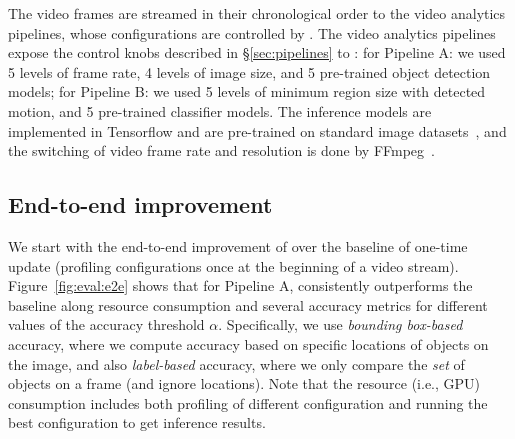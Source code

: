 The video frames are streamed in their chronological order to the video analytics pipelines, whose configurations are controlled by \name.
The video analytics pipelines expose the control knobs described in \S\ref{sec:pipelines} to \name: 
for Pipeline A: we used 5 levels of frame rate, 4 levels of image size, and 5 pre-trained object detection models; for Pipeline B: we used 5 levels of minimum region size with detected motion, and 5 pre-trained classifier models.
The inference models are implemented in Tensorflow and are pre-trained on standard image datasets~\cite{detectors}, and the switching of video frame rate and resolution is done by FFmpeg~\cite{ffmpeg}.

\subsection{End-to-end improvement}
\label{sec:eval:e2e}
We start with the end-to-end improvement of \name over the baseline of one-time update (profiling configurations once at the beginning of a video stream).
Figure~\ref{fig:eval:e2e} shows that for Pipeline A, \name consistently outperforms the baseline along resource consumption and several accuracy metrics for different values of the accuracy threshold $\alpha$. Specifically, we use \emph{bounding box-based} accuracy, where we compute accuracy based on specific locations of objects on the image, and also \emph{label-based} accuracy, where we only compare the \emph{set} of objects on a frame (and ignore locations). Note that the resource (i.e., GPU) consumption includes both profiling of different configuration and running the best configuration to get inference results.

